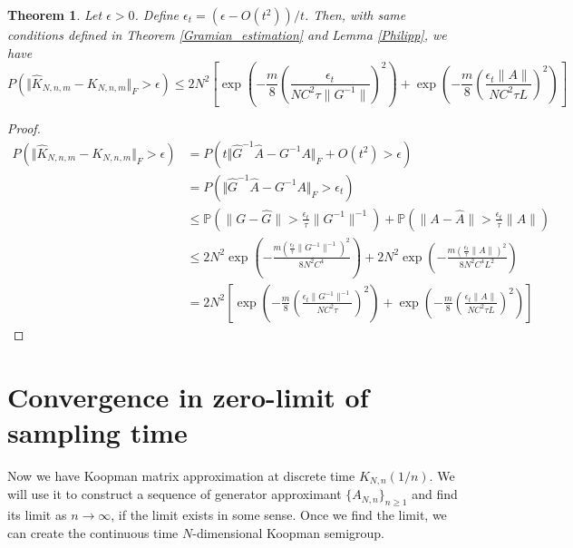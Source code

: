 \documentclass{article}[11]
\newtheorem{theorem}{Theorem}
\begin{document}
	\begin{theorem}
		Let $\epsilon>0$. Define $\epsilon_t = \left(\epsilon - O(t^2)\right)/t$. Then, with same conditions defined in Theorem \ref{Gramian_estimation} and Lemma \ref{Philipp}, we have
		\begin{equation*}
			P\left(\Vert \widehat{K}_{N,n,m} - K_{N,n,m} \Vert_F > \epsilon \right) \leq 2N^2 \left[ \exp \left( -\frac{m}{8} \left(\frac{\epsilon_t}{N C^2 \tau \|G^{-1}\|}\right)^2 \right) + \exp \left( -\frac{m}{8} \left(\frac{\epsilon_t \|A\|}{N C^2 \tau L}\right)^2 \right) \right]
		\end{equation*}  
	\end{theorem}
	\begin{proof}
		\begin{align*}
			P\left(\Vert \widehat{K}_{N,n,m} - K_{N,n,m} \Vert_F > \epsilon \right) 
			&= P\left( t\Vert \widehat{G}^{-1} \widehat{A} - G^{-1}A \Vert_F + O(t^2) > \epsilon \right) \\
			&= P\left( \Vert \widehat{G}^{-1} \widehat{A} - G^{-1}A \Vert_F  > \epsilon_t \right) \\
			&\leq \mathbb{P}\left(\|G - \widehat{G}\| > \frac{\epsilon_t}{\tau} \|G^{-1}\|^{-1} \right) + \mathbb{P}\left(\|A - \widehat{A}\| > \frac{\epsilon_t}{\tau} \|A\| \right) \\
			&\leq 2N^2 \exp \left( -\frac{m (\frac{\epsilon_t}{\tau} \|G^{-1}\|^{-1})^2}{8 N^2 C^4} \right) + 2N^2 \exp \left( -\frac{m (\frac{\epsilon_t}{\tau} \|A\|)^2}{8 N^2 C^4 L^2} \right) \\
			&= 2N^2 \left[ \exp \left( -\frac{m}{8} \left(\frac{\epsilon_t \|G^{-1}\|^{-1}}{N C^2 \tau}\right)^2 \right) + \exp \left( -\frac{m}{8} \left(\frac{\epsilon_t \|A\|}{N C^2 \tau L}\right)^2 \right) \right]
		\end{align*}  
	\end{proof}
	
	
	\newpage
	\section{Convergence in zero-limit of sampling time}
	Now we have Koopman matrix approximation at discrete time $K_{N,n}(1/n)$. We will use it to construct a sequence of generator approximant $\{A_{N,n}\}_{n\geq 1}$ and find its limit as $n\to\infty$, if the limit exists in some sense. Once we find the limit, we can create the continuous time $N$-dimensional Koopman semigroup. 
	
\end{document}
